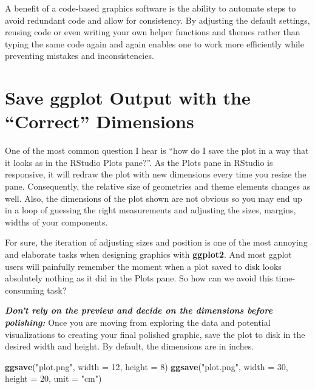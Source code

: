 \documentclass[
]{krantz}
\makeatletter
\newenvironment{Shaded}{\begin{snugshade}}{\end{snugshade}}
\newcommand{\AttributeTok}[1]{\textcolor[rgb]{0.27,0.27,0.27}{#1}}
\newcommand{\DecValTok}[1]{\textcolor[rgb]{0.06,0.06,0.06}{#1}}
\newcommand{\FunctionTok}[1]{\textcolor[rgb]{0.27,0.27,0.27}{\textbf{#1}}}
\newcommand{\NormalTok}[1]{#1}
\newcommand{\StringTok}[1]{\textcolor[rgb]{0.5,0.5,0.5}{#1}}
\newenvironment{kframe}{%
\medskip{}
\setlength{\fboxsep}{.8em}
 \def\at@end@of@kframe{}%
 \ifinner\ifhmode%
  \def\at@end@of@kframe{\end{minipage}}%
  \begin{minipage}{\columnwidth}%
 \fi\fi%
 \def\FrameCommand##1{\hskip\@totalleftmargin \hskip-\fboxsep
 \colorbox{shadecolor}{##1}\hskip-\fboxsep
     \hskip-\linewidth \hskip-\@totalleftmargin \hskip\columnwidth}%
 \MakeFramed {\advance\hsize-\width
   \@totalleftmargin\z@ \linewidth\hsize
   \@setminipage}}%
 {\par\unskip\endMakeFramed%
 \at@end@of@kframe}
\renewenvironment{Shaded}{\begin{kframe}}{\end{kframe}}
\makeatother
\begin{document}
A benefit of a code-based graphics software is the ability to automate steps to avoid redundant code and allow for consistency. By adjusting the default settings, reusing code or even writing your own helper functions and themes rather than typing the same code again and again enables one to work more efficiently while preventing mistakes and inconsistencies.

\hypertarget{save-ggplot-output-with-the-correct-dimensions}{%
\section{Save ggplot Output with the ``Correct'' Dimensions}\label{save-ggplot-output-with-the-correct-dimensions}}

One of the most common question I hear is ``how do I save the plot in a way that it looks as in the RStudio Plots pane?''. As the Plots pane in RStudio is responsive, it will redraw the plot with new dimensions every time you resize the pane. Consequently, the relative size of geometries and theme elements changes as well. Also, the dimensions of the plot shown are not obvious so you may end up in a loop of guessing the right measurements and adjusting the sizes, margins, widths of your components.

For sure, the iteration of adjusting sizes and position is one of the most annoying and elaborate tasks when designing graphics with \textbf{ggplot2}. And most ggplot users will painfully remember the moment when a plot saved to disk looks absolutely nothing as it did in the Plots pane. So how can we avoid this time-consuming task?

\textbf{\emph{Don't rely on the preview and decide on the dimensions before polishing:}} Once you are moving from exploring the data and potential visualizations to creating your final polished graphic, save the plot to disk in the desired width and height. By default, the dimensions are in inches.

\begin{Shaded}
\begin{Highlighting}[]
\FunctionTok{ggsave}\NormalTok{(}\StringTok{"plot.png"}\NormalTok{, }\AttributeTok{width =} \DecValTok{12}\NormalTok{, }\AttributeTok{height =} \DecValTok{8}\NormalTok{)}
\FunctionTok{ggsave}\NormalTok{(}\StringTok{"plot.png"}\NormalTok{, }\AttributeTok{width =} \DecValTok{30}\NormalTok{, }\AttributeTok{height =} \DecValTok{20}\NormalTok{, }\AttributeTok{unit =} \StringTok{"cm"}\NormalTok{)}
\end{Highlighting}
\end{Shaded}
\end{document}
